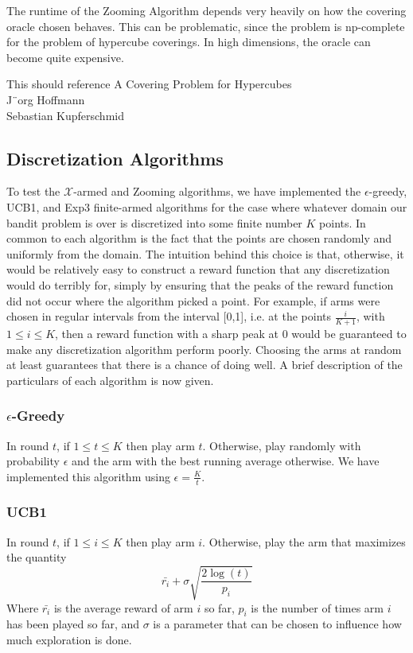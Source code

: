 The runtime of the Zooming Algorithm depends very heavily on how the
covering oracle chosen behaves. This can be problematic, since the problem
is np-complete for the problem of hypercube coverings. In high dimensions,
the oracle can become quite expensive.

This should reference A Covering Problem for Hypercubes\\J¨org Hoffmann\\Sebastian Kupferschmid

\subsection{Discretization Algorithms}
To test the $\mathcal{X}$-armed and Zooming algorithms, we have implemented
the $\epsilon$-greedy, UCB1, and Exp3 finite-armed algorithms for
the case where whatever domain our bandit problem is over is discretized
into some finite number $K$ points.  In common to each algorithm is the
fact that the points are chosen randomly and uniformly from the domain.  The
intuition behind this choice is that, otherwise, it would be relatively easy
to construct a reward function that any discretization would do terribly
for, simply by ensuring that the peaks of the reward function did not occur
where the algorithm picked a point.  For example, if arms were chosen in
regular intervals from the interval [0,1], i.e. at the points 
$\frac{i}{K+1}$, with $1 \leq i \leq K$, then a reward function with a
sharp peak at 0 would be guaranteed to make any discretization algorithm
perform poorly.  Choosing the arms at random at least guarantees that there
is a chance of doing well.  A brief description of the particulars of 
each algorithm is now given.

\subsubsection{$\epsilon$-Greedy}
In round $t$, if $1 \leq t \leq K$ then play arm $t$.  Otherwise, play
randomly with probability $\epsilon$ and the arm with the best running
average otherwise.  We have implemented this algorithm using
$\epsilon = \frac{K}{t}$.

\subsubsection{UCB1}
In round $t$, if $1 \leq i \leq K$ then play arm $i$.  Otherwise, play
the arm that maximizes the quantity
\[
	\bar{r_i} + \sigma \sqrt{\frac{2 \log(t)}{p_i}}
\]
Where $\bar{r_i}$ is the average reward of arm $i$ so far, $p_i$ is the 
number of times arm $i$ has been played so far, and $\sigma$ is a parameter
that can be chosen to influence how much exploration is done.

